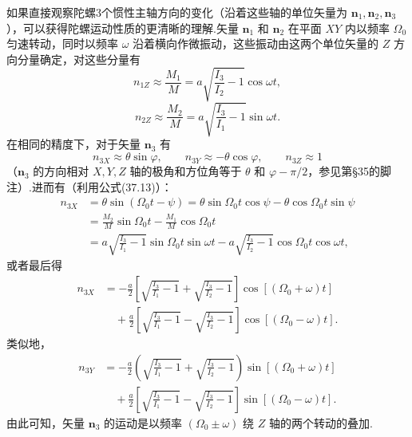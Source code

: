 \begin{xiti}
如果直接观察陀螺3个惯性主轴方向的变化（沿着这些轴的单位矢量为
$\boldsymbol{n}_1,\boldsymbol{n}_2,\boldsymbol{n}_3$），可以获得陀螺运动性质的更清晰的理解.矢量 $\boldsymbol{n}_1$ 和 $\boldsymbol{n}_2$ 在平面 $XY$ 内以频率 $\Omega_0$ 匀速转动，同时以频率 $\omega$ 沿着横向作微振动，这些振动由这两个单位矢量的 $Z$ 方向分量确定，对这些分量有
\begin{equation*}
  n_{1Z}\approx\frac{M_1}{M}
  =a\sqrt{\frac{I_3}{I_2}-1}\cos\omega t,
\end{equation*}
\begin{equation*}
  n_{2Z}\approx\frac{M_2}{M}
  =a\sqrt{\frac{I_3}{I_1}-1}\sin\omega t.
\end{equation*}
在相同的精度下，对于矢量 $\boldsymbol{n}_3$ 有
\begin{equation*}
  n_{3X}\approx\theta\sin\varphi,\qquad
  n_{3Y}\approx-\theta\cos\varphi,\qquad
  n_{3Z}\approx1
\end{equation*}
（$\boldsymbol{n}_3$ 的方向相对 $X,Y,Z$ 轴的极角和方位角等于 $\theta$ 和 $\varphi-\pi/2$，参见第§35的脚注）.进而有（利用公式(37.13)）：
\begin{equation*}
\begin{aligned}
  n_{3X}&=\theta\sin(\Omega_0 t-\psi)
  =\theta\sin\Omega_0 t\cos\psi-\theta\cos\Omega_0 t\sin\psi\\
  &=\frac{M_2}{M}\sin\Omega_0 t-\frac{M_1}{M}\cos\Omega_0 t\\
  &=a\sqrt{\frac{I_3}{I_1}-1}\sin\Omega_0 t\sin\omega t
  -a\sqrt{\frac{I_3}{I_2}-1}\cos\Omega_0 t\cos\omega t,
\end{aligned}
\end{equation*}
或者最后得
\begin{equation*}
\begin{aligned}
  n_{3X}&=-\frac{a}{2}\left[\sqrt{\frac{I_3}{I_1}-1}
  +\sqrt{\frac{I_3}{I_2}-1}\right]\cos\left[\left(\Omega_0+\omega\right)t\right]\\
  &\quad+\frac{a}{2}\left[\sqrt{\frac{I_3}{I_1}-1}
  -\sqrt{\frac{I_3}{I_2}-1}\right]\cos\left[\left(\Omega_0-\omega\right)t\right].
\end{aligned}
\end{equation*}
类似地，
\begin{equation*}
\begin{aligned}
  n_{3Y}&=-\frac{a}{2}\left(\sqrt{\frac{I_3}{I_1}-1}
  +\sqrt{\frac{I_3}{I_2}-1}\right)\sin\left[\left(\Omega_0+\omega\right)t\right]\\
  &\quad+\frac{a}{2}\left[\sqrt{\frac{I_3}{I_1}-1}
  -\sqrt{\frac{I_3}{I_2}-1}\right]\sin\left[\left(\Omega_0-\omega\right)t\right].
\end{aligned}
\end{equation*}
由此可知，矢量 $\boldsymbol{n}_3$ 的运动是以频率 $\left(\Omega_0\pm\omega\right)$ 绕 $Z$ 轴的两个转动的叠加.


\end{xiti}
